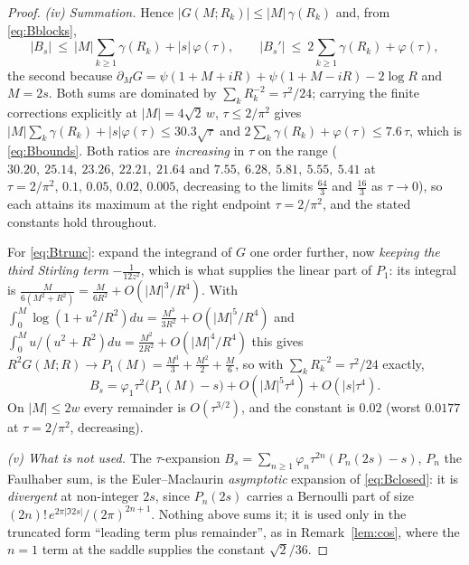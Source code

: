 \documentclass[11pt]{article}
\theoremstyle{plain}
\theoremstyle{definition}
\theoremstyle{remark}
\begin{document}
\begin{proof}
\emph{(iv) Summation.} Hence $|G(M;R_k)|\le|M|\,\gamma(R_k)$ and, from \eqref{eq:Bblocks},
\[
   |B_s|\ \le\ |M|\sum_{k\ge1}\gamma(R_k)+|s|\,\varphi(\tau),
   \qquad
   |B_s'|\ \le\ 2\sum_{k\ge1}\gamma(R_k)+\varphi(\tau),
\]
the second because $\partial_MG=\psi(1{+}M{+}iR)+\psi(1{+}M{-}iR)-2\log R$ and $M=2s$. Both sums are
dominated by $\sum_k R_k^{-2}=\tau^2/24$; carrying the finite corrections explicitly at
$|M|=4\sqrt2\,w$, $\tau\le2/\pi^2$ gives $|M|\sum_k\gamma(R_k)+|s|\varphi(\tau)\le30.3\sqrt\tau$ and
$2\sum_k\gamma(R_k)+\varphi(\tau)\le7.6\,\tau$, which is \eqref{eq:Bbounds}. Both ratios are \emph{increasing} in $\tau$ on the range ($30.20,\ 25.14,\ 23.26,\ 22.21,\
21.64$ and $7.55,\ 6.28,\ 5.81,\ 5.55,\ 5.41$ at $\tau=2/\pi^2,\,0.1,\,0.05,\,0.02,\,0.005$,
decreasing to the limits $\tfrac{64}3$ and $\tfrac{16}3$ as $\tau\to0$), so each attains its
maximum at the right endpoint $\tau=2/\pi^2$, and the stated constants hold throughout.

For \eqref{eq:Btrunc}: expand the integrand of $G$ one order further, now \emph{keeping the third
Stirling term} $-\tfrac1{12z^2}$, which is what supplies the linear part of $P_1$: its integral
is $\tfrac{M}{6(M^2+R^2)}=\tfrac{M}{6R^2}+O(|M|^3/R^4)$. With
$\int_0^M\log(1+u^2/R^2)du=\tfrac{M^3}{3R^2}+O(|M|^5/R^4)$ and
$\int_0^Mu/(u^2{+}R^2)du=\tfrac{M^2}{2R^2}+O(|M|^4/R^4)$ this gives
$R^2G(M;R)\to P_1(M)=\tfrac{M^3}3+\tfrac{M^2}2+\tfrac M6$, so with $\sum_kR_k^{-2}=\tau^2/24$
exactly,
\[
   B_s=\varphi_1\tau^2\bigl(P_1(M)-s\bigr)+O(|M|^5\tau^4)+O(|s|\tau^4).
\]
On $|M|\le2w$ every remainder is $O(\tau^{3/2})$, and the constant is $0.02$ (worst $0.0177$ at
$\tau=2/\pi^2$, decreasing).

\emph{(v) What is \emph{not} used.} The $\tau$-expansion
$B_s=\sum_{n\ge1}\varphi_n\tau^{2n}(P_n(2s)-s)$, $P_n$ the Faulhaber sum, is the
Euler--Maclaurin \emph{asymptotic} expansion of \eqref{eq:Bclosed}: it is \emph{divergent} at
non-integer $2s$, since $P_n(2s)$ carries a Bernoulli part of size
$(2n)!\,e^{2\pi|\Im 2s|}/(2\pi)^{2n+1}$. Nothing above sums it; it is used only in the truncated
form ``leading term plus remainder'', as in Remark~\ref{lem:cos}, where the $n=1$ term at the saddle
supplies the constant $\sqrt2/36$.
\end{proof}
\end{document}

